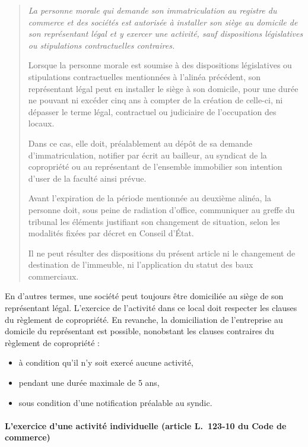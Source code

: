 				\begin{quote}
					\itshape
					La personne morale qui demande son immatriculation au registre du commerce et des sociétés est autorisée à installer son siège au domicile de son représentant légal et y exercer une activité, sauf dispositions législatives ou stipulations contractuelles contraires.
					
					Lorsque la personne morale est soumise à des dispositions législatives ou stipulations contractuelles mentionnées à l'alinéa précédent, son représentant légal peut en installer le siège à son domicile, pour une durée ne pouvant ni excéder cinq ans à compter de la création de celle-ci, ni dépasser le terme légal, contractuel ou judiciaire de l'occupation des locaux.
					
					Dans ce cas, elle doit, préalablement au dépôt de sa demande d'immatriculation, notifier par écrit au bailleur, au syndicat de la copropriété ou au représentant de l'ensemble immobilier son intention d'user de la faculté ainsi prévue.
					
					Avant l'expiration de la période mentionnée au deuxième alinéa, la personne doit, sous peine de radiation d'office, communiquer au greffe du tribunal les éléments justifiant son changement de situation, selon les modalités fixées par décret en Conseil d'État.
					
					Il ne peut résulter des dispositions du présent article ni le changement de destination de l'immeuble, ni l'application du statut des baux commerciaux.
				\end{quote}
				
				En d’autres termes, une société peut toujours être domiciliée au siège de son représentant légal. L’exercice de l’activité dans ce local doit respecter les clauses du règlement de copropriété. En revanche, la domiciliation de l’entreprise au domicile du représentant est possible, nonobstant les clauses contraires du règlement de copropriété :
				\begin{itemize}
					\item à condition qu’il n’y soit exercé aucune activité,
					\item pendant une durée maximale de 5 ans,
					\item sous condition d’une notification préalable au syndic.
				\end{itemize}
				
			\paragraph{L'exercice d'une activité individuelle (article L.~123-10 du Code de commerce)}
			
